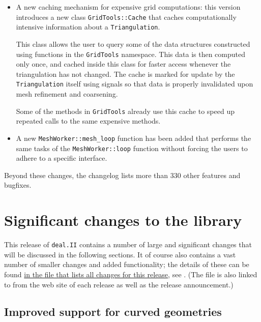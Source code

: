 \documentclass{ansarticle-preprint}
\newcommand{\specialword}[1]{\texttt{#1}}
\newcommand{\dealii}{{\specialword{deal.II}}\xspace}
\begin{document}
\begin{itemize}
\item A new caching mechanism for expensive grid computations: this version introduces a new
  class \texttt{GridTools::Cache} that caches computationally intensive
  information about a \texttt{Triangulation}.

This class allows the user to query some of the data structures constructed
using functions in the \texttt{GridTools} namespace. This data is then
computed only once, and
cached inside this class for faster access whenever the triangulation has
not changed. The cache is marked for update by the \texttt{Triangulation} itself
using signals so that data is properly invalidated upon mesh
refinement and coarsening.

Some of the methods in \texttt{GridTools} already use this cache to
speed up repeated calls to the same expensive methods.
\item A new \texttt{MeshWorker::mesh\_loop} function has been added that
  performs the same tasks of the \texttt{MeshWorker::loop} function without
  forcing the users to adhere to a specific interface.

\end{itemize}
Beyond these changes, the changelog lists more than 330 other features and bugfixes.




\section{Significant changes to the library}

This release of \dealii contains a number of large and significant changes
that will be discussed in the following sections. It of course also contains a
vast number of smaller changes and added functionality; the details of these
can be found
\href{https://www.dealii.org/developer/doxygen/deal.II/changes_between_8_5_and_9_0.html}{
in the file that lists all changes for this release}, see \cite{changes90}.
(The file is also linked to from the web site of each release as well as
the release announcement.)

\subsection{Improved support for curved geometries}
\label{sec:manifolds}
\end{document}
